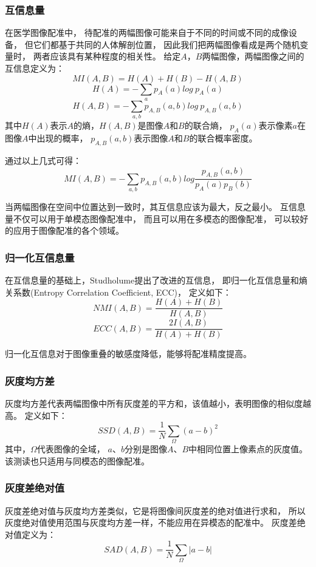 \subsubsection{互信息量}
在医学图像配准中，
待配准的两幅图像可能来自于不同的时间或不同的成像设备，
但它们都基于共同的人体解剖位置，
因此我们把两幅图像看成是两个随机变量时，
两者应该具有某种程度的相关性。
给定$A$，$B$两幅图像，两幅图像之间的互信息定义为：
\begin{equation}
  MI(A,B)=H(A)+H(B)-H(A,B)
\end{equation}
\begin{equation}
  H(A)=-\sum_ap_A(a)log\ p_A(a)
\end{equation}
\begin{equation}
  H(A,B)=-\sum_{a,b}p_{A,B}(a,b)log\ p_{A,B}(a,b)
\end{equation}
其中$H(A)$表示$A$的熵，$H(A,B)$是图像$A$和$B$的联合熵，
$p_A(a)$表示像素$a$在图像$A$中出现的概率，
$p_{A,B}(a,b)$表示图像$A$和$B$的联合概率密度。

通过以上几式可得：
\begin{equation}
  MI(A,B)=-\sum_{a,b}p_{A,B}(a,b)log\frac{p_{A,B}(a,b)}{p_A(a)p_B(b)}
\end{equation}

当两幅图像在空间中位置达到一致时，其互信息应该为最大，反之最小。
互信息量不仅可以用于单模态图像配准中，
而且可以用在多模态的图像配准，
可以较好的应用于图像配准的各个领域。

\subsubsection{归一化互信息量}
在互信息量的基础上，Studholume提出了改进的互信息，
即归一化互信息量和熵关系数(Entropy Correlation Coefficient, ECC)，
定义如下：
\begin{equation}
  NMI(A,B)=\frac{H(A)+H(B)}{H(A,B)}
\end{equation}
\begin{equation}
  ECC(A,B)=\frac{2I(A,B)}{H(A)+H(B)}
\end{equation}

归一化互信息对于图像重叠的敏感度降低，能够将配准精度提高。

\subsubsection{灰度均方差}
灰度均方差代表两幅图像中所有灰度差的平方和，该值越小，表明图像的相似度越高。
定义如下：
\begin{equation}
  SSD(A,B)=\frac{1}{N}\sum_{\Omega}(a-b)^2
\end{equation}
其中，$\Omega$代表图像的全域，
$a$、$b$分别是图像$A$、$B$中相同位置上像素点的灰度值。
该测读也只适用与同模态的图像配准。

\subsubsection{灰度差绝对值}
灰度差绝对值与灰度均方差类似，它是将图像间灰度差的绝对值进行求和，
所以灰度绝对值使用范围与灰度均方差一样，不能应用在异模态的配准中。
灰度差绝对值定义为：
\begin{equation}
  SAD(A,B)=\frac{1}{N}\sum_\Omega\lvert a-b\rvert
\end{equation}


